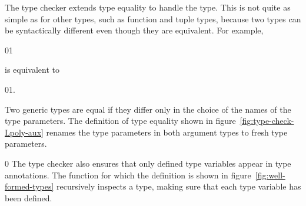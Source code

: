 \documentclass[7x10]{TimesAPriori_MIT}%
\def\racketEd{0}
\def\pythonEd{1}
\def\edition{1}
\newcommand{\racket}[1]{{\if\edition\racketEd{#1}\fi}}
\newcommand{\pythonColor}[0]{}
\newcommand{\python}[1]{{\if\edition\pythonEd\pythonColor #1\fi}}
\numberwithin{theorem}{chapter}
\numberwithin{definition}{chapter}
\numberwithin{equation}{chapter}
\begin{document}
The type checker extends type equality to handle the  type.
This is not quite as simple as for other types, such as function and
tuple types, because two  types can be syntactically
different even though they are equivalent. For example,
\begin{center}
\racket{}\python{}
\end{center}
is equivalent to
\begin{center}
\racket{}\python{}.
\end{center}
Two generic types are equal if they differ only in
the choice of the names of the type parameters. The definition of type
equality shown in figure~\ref{fig:type-check-Lpoly-aux} renames the type
parameters in both argument types to fresh type parameters.

{\if\edition\racketEd
%
The type checker also ensures that only defined type variables appear
in type annotations. The  function for which
the definition is shown in figure~\ref{fig:well-formed-types}
recursively inspects a type, making sure that each type variable has
been defined.
%
\fi}
\end{document}
